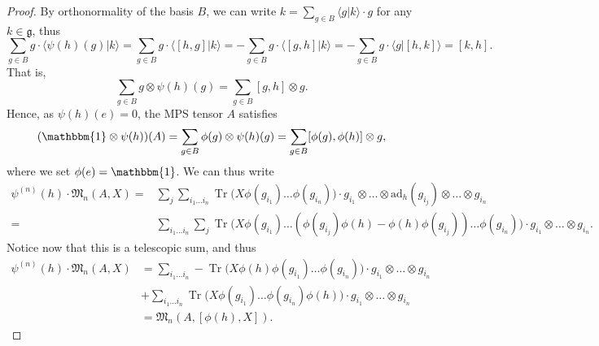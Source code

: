\documentclass[a4paper]{article}
\newcommand{\scalprod}[2]{\langle #1 \vert #2 \rangle}
\newcommand{\tr}{\operatorname{Tr}}
\newcommand{\id}{\mathbbm{1}}
\newcommand{\ad}{\mathrm{ad}}
\theoremstyle{definition}
\begin{document}
\begin{proof}
    By orthonormality of the basis $B$, we can write $k = \sum_{g\in B} \langle g|k\rangle \cdot g$ for any $k\in\mathfrak{g}$, thus  
    \begin{equation*}
        \sum_{g\in B} g \cdot  \langle \psi(h) (g)|k \rangle = \sum_{g\in B} g \cdot  \scalprod{[h,g]}{k} = - \sum_{g\in B} g \cdot  \scalprod{[g,h]}{k} = - \sum_{g\in B} g \cdot  \scalprod{g}{[h,k]}  = [k,h].
    \end{equation*}
    That is,
    \begin{equation*}
        \sum_{g\in B} g \otimes \psi(h) (g) = \sum_{g\in B} [g,h] \otimes g.
    \end{equation*}
    Hence, as $\psi(h)(e) = 0$, the MPS tensor $A$ satisfies 
    \begin{equation}\label{eq:GS_covariance_1}
        (\id\otimes \psi(h))(A) = \sum_{g\in B} \phi(g) \otimes \psi(h) (g) = \sum_{g\in B} [\phi(g),\phi(h)] \otimes g,
    \end{equation}
    where we set $\phi(e) = \mathbbm{1}$. We can thus write 
    \begin{equation*}
        \begin{aligned}
            \psi^{(n)}(h) \cdot\mathfrak{M}_n(A,X) = &\sum_j \sum_{i_1 \dots i_n} \tr\big( X \phi(g_{i_1}) \dots \phi(g_{i_n}) \big) \cdot g_{i_1}\otimes \dots \otimes \ad_h(g_{i_j})\otimes  \dots \otimes g_{i_n} \\ 
            =&\sum_{i_1 \dots i_n} \sum_j \tr\big( X \phi(g_{i_1}) \dots (\phi(g_{i_j}) \phi(h) - \phi(h) \phi(g_{i_j}) ) \dots \phi(g_{i_n})\big) \cdot g_{i_1}\otimes   \dots \otimes g_{i_n}.
        \end{aligned}
    \end{equation*}
    Notice now that this is a telescopic sum, and thus 
    \begin{equation*}
        \begin{aligned}
            \psi^{(n)}(h) \cdot\mathfrak{M}_n(A,X)  
            &=\sum_{i_1 \dots i_n} -\tr\big( X \phi(h) \phi(g_{i_1}) \dots  \phi(g_{i_n})\big) \cdot g_{i_1}\otimes   \dots \otimes g_{i_n} \\
            &+\sum_{i_1 \dots i_n} \tr\big( X \phi(g_{i_1}) \dots  \phi(g_{i_n}) \phi(h) \big) \cdot g_{i_1}\otimes   \dots \otimes g_{i_n} \\ &=  \mathfrak{M}_n(A,[\phi(h),X]).
        \end{aligned}
    \end{equation*}
\end{proof}
\end{document}
